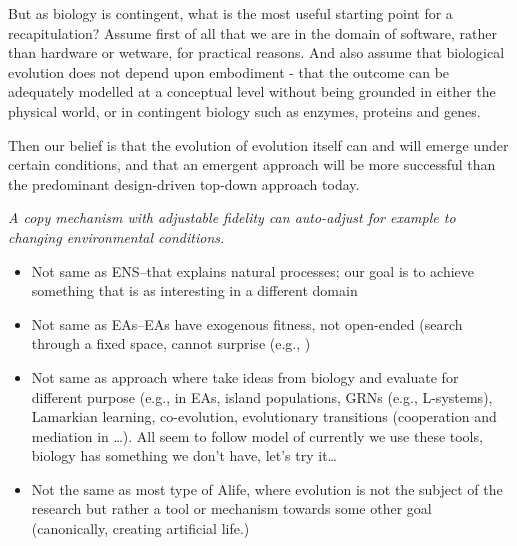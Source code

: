But as biology is contingent, what is the most useful starting point for a recapitulation? Assume first of all that we are in the domain of software, rather than hardware or wetware, for practical reasons. And also assume that biological evolution does not depend upon embodiment - that the outcome can be adequately modelled at a conceptual level without being grounded in either the physical world, or in contingent biology such as enzymes, proteins and genes.

Then our belief is that the evolution of evolution itself can and will emerge under certain conditions, and that an emergent approach will be more successful than the predominant design-driven top-down approach today.


\emph{A copy mechanism with adjustable fidelity can auto-adjust for example to changing environmental conditions.}

\begin{itemize}
	\item
	      Not same as ENS--that explains natural processes; our goal is to achieve something that is as interesting in a different domain
	\item 
	      Not same as EAs--EAs have exogenous fitness, not open-ended (search through a fixed space, cannot surprise (e.g., \autocite{Nellis2014})
	\item  
	      Not same as approach where take ideas from biology and evaluate for different purpose (e.g., in EAs, island populations, GRNs (e.g., L-systems), Lamarkian learning, co-evolution, evolutionary transitions (cooperation and mediation in \autocite{Defaweux:2005fk}\ldots{}). All seem to follow model of currently we use these tools, biology has something we don't have, let's try it\ldots{}
	\item
	      Not the same as most type of Alife, where evolution is not the subject of the research but rather a tool or mechanism towards some other goal (canonically, creating artificial life.)
\end{itemize}

